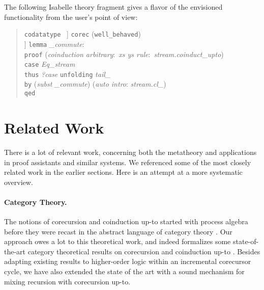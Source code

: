 \documentclass[preprint,draft]
{sigplanconf}
\newcommand\keyw[1]{\texttt{#1}}
\newcommand{\<}{\langle}
\renewcommand{\>}{\rangle}
\begin{document}
The following Isabelle theory fragment gives a flavor of the envisioned functionality
from the user's point of view:

\begin{quote}
  \keyw{codatatype} \,  
\2\jot]
  \keyw{corec} (\keyw{well\_behaved})  \\
  \hbox{}\quad
\2\jot]
  \keyw{lemma} \textit{\_commute}:\enskip  \\
  \keyw{proof} (\textit{coinduction arbitrary}:\ \textit{xs ys rule}:\ \textit{stream.coinduct\_upto})\kern-200mm \\
  \hbox{}\quad\keyw{case} \textit{Eq\_stream} \\
  \hbox{}\quad\keyw{thus} \textit{?case} \keyw{unfolding} \textit{tail\_} \\
  \hbox{}\qquad\keyw{by} (\textit{subst} \textit{\_commute}) (\textit{auto intro}: \textit{stream.cl\_}) \\
  \keyw{qed}
\end{quote}






\section{Related Work}
\label{sec-rel}

There is a lot of relevant work, concerning both the metatheory and applications
in proof assistants and similar systems. We referenced some of the most closely
related work in the earlier sections. Here is an attempt at a more systematic overview.

\paragraph{Category Theory.}
The notions of corecursion and coinduction up-to started with process algebra
\cite{san-bis, RuttenProcAsTerms} before they were
recast in the abstract language of category theory
\cite{BartelsGeneralizedCoind,turi-plotkin97,klin11-bialgebras,milius-modular,jacobs06-distrib,rot-uptoCoind,hinze-adventure}.
Our approach owes a lot to this theoretical work, and indeed formalizes some state-of-the-art
category theoretical results on corecursion and coinduction up-to \cite{milius-modular,rot-uptoCoind}.
Besides adapting existing results to higher-order logic within an incremental corecursor cycle,
we have also extended the state of the art with a sound mechanism for mixing recursion with corecursion up-to.
\end{document}
